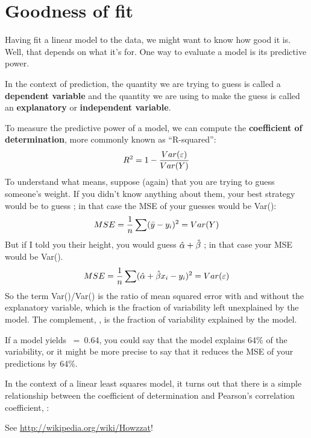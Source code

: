 \documentclass[12pt]{book}
\begin{document}
\section{Goodness of fit}

Having fit a linear model to the data, we might want to know how good
it is.  Well, that depends on what it's for.  One way to evaluate a
model is its predictive power.

In the context of prediction, the quantity we are trying to guess is
called a {\bf dependent variable} and the quantity we are using to
make the guess is called an {\bf explanatory} or {\bf independent
  variable}.

To measure the predictive power of a model, we can compute the {\bf
  coefficient of determination}, more commonly known as ``R-squared'':
%
\[ R^2 = 1 - \frac{Var(\varepsilon)}{Var(Y)}\]
%
To understand what \R{} means, suppose (again) that you are trying
to guess someone's weight.  If you didn't know anything about them,
your best strategy would be to guess \myybar; in
that case the MSE of your guesses would be Var(\Y):
%
\[ MSE = \frac{1}{n} \sum (\bar{y} - y_i)^2 = Var(Y) \]
%
But if I told you their height, you would guess $\hat{\alpha} +
\hat{\beta}$ \x{}; in that case your MSE would be Var(\myeps).
%
\[ MSE = 
\frac{1}{n} \sum (\hat{\alpha} + \hat{\beta} x_i - y_i)^2 =
Var(\varepsilon) \]
%
So the term Var(\myeps)/Var(\Y) is the ratio of mean squared error with
and without the explanatory variable, which is the fraction of
variability left unexplained by the model.  The complement, \R{},
is the fraction of variability explained by the model.

If a model yields \R{}~=~0.64, you could say that the model explains
64\% of the variability, or it might be more precise to say that it
reduces the MSE of your predictions by 64\%.

In the context of a linear least squares model, it turns out that
there is a simple relationship between the coefficient of
determination and Pearson's correlation coefficient, \myrho:


See \url{http://wikipedia.org/wiki/Howzzat}!
\end{document}
